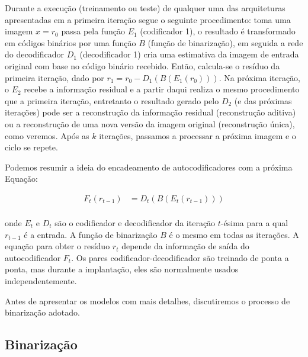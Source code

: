 Durante a execução (treinamento ou teste) de qualquer uma das arquiteturas apresentadas em \cite{Variable2016Toderici} a primeira iteração segue o seguinte procedimento: toma uma imagem $x = r_0$ passa pela função $E_1$ (codificador 1), o resultado é transformado em códigos binários por uma função $B$ (função de binarização), em seguida a rede do decodificador $D_1$ (decodificador 1) cria uma estimativa da imagem de entrada original com base no código binário recebido. Então, calcula-se o resíduo da primeira iteração, dado por $r_1 = r_0 - D_1(B(E_1(r_0)))$. 
Na próxima iteração, o $E_2$ recebe a informação residual e a partir daqui realiza o mesmo procedimento que a primeira iteração, entretanto o resultado gerado pelo $D_2$ (e das próximas iterações) pode ser a reconstrução da informação residual (reconstrução aditiva) ou a reconstrução de uma nova versão da imagem original (reconstrução única), como veremos.  Após as $k$ iterações, passamos a processar a próxima imagem e o ciclo se repete. 

Podemos resumir a ideia do encadeamento de autocodificadores com a próxima Equação: 

\begin{equation}
\begin{aligned}
F_t(r_{t-1}) &= D_t(B(E_t(r_{t-1}))) \\
\end{aligned}
\end{equation}

onde $E_t$ e $D_t$ são o codificador e decodificador da iteração $t$-ésima para a qual $ r_{t-1}$ é a entrada. A função de binarização $B$ é o mesmo em todas as iterações. A equação para obter o resíduo $r_t$ depende da informação de saída do autocodificador $F_t$.  Os pares codificador-decodificador são treinado de ponta a ponta, mas durante a implantação, eles são normalmente usados independentemente.

Antes de apresentar os modelos com mais detalhes, discutiremos o processo de binarização adotado.


\subsection{Binarização}
\label{subsec:bin}



